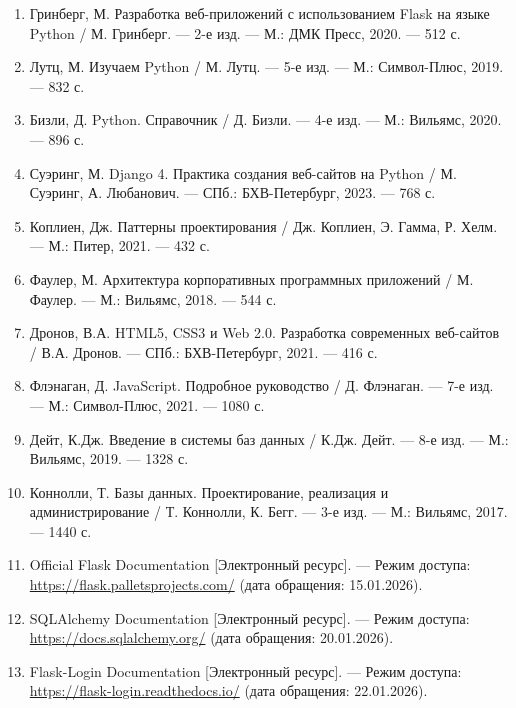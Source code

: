 \documentclass[14pt,a4paper,oneside]{extarticle}
\begin{document}
\begin{enumerate}[leftmargin=2cm]
    \item Гринберг, М. Разработка веб-приложений с использованием Flask на языке Python / М. Гринберг. --- 2-е изд. --- М.: ДМК Пресс, 2020. --- 512 с.

    \item Лутц, М. Изучаем Python / М. Лутц. --- 5-е изд. --- М.: Символ-Плюс, 2019. --- 832 с.

    \item Бизли, Д. Python. Справочник / Д. Бизли. --- 4-е изд. --- М.: Вильямс, 2020. --- 896 с.

    \item Суэринг, М. Django 4. Практика создания веб-сайтов на Python / М. Суэринг, А. Любанович. --- СПб.: БХВ-Петербург, 2023. --- 768 с.

    \item Коплиен, Дж. Паттерны проектирования / Дж. Коплиен, Э. Гамма, Р. Хелм. --- М.: Питер, 2021. --- 432 с.

    \item Фаулер, М. Архитектура корпоративных программных приложений / М. Фаулер. --- М.: Вильямс, 2018. --- 544 с.

    \item Дронов, В.А. HTML5, CSS3 и Web 2.0. Разработка современных веб-сайтов / В.А. Дронов. --- СПб.: БХВ-Петербург, 2021. --- 416 с.

    \item Флэнаган, Д. JavaScript. Подробное руководство / Д. Флэнаган. --- 7-е изд. --- М.: Символ-Плюс, 2021. --- 1080 с.

    \item Дейт, К.Дж. Введение в системы баз данных / К.Дж. Дейт. --- 8-е изд. --- М.: Вильямс, 2019. --- 1328 с.

    \item Коннолли, Т. Базы данных. Проектирование, реализация и администрирование / Т. Коннолли, К. Бегг. --- 3-е изд. --- М.: Вильямс, 2017. --- 1440 с.

    \item Official Flask Documentation [Электронный ресурс]. --- Режим доступа: \url{https://flask.palletsprojects.com/} (дата обращения: 15.01.2026).

    \item SQLAlchemy Documentation [Электронный ресурс]. --- Режим доступа: \url{https://docs.sqlalchemy.org/} (дата обращения: 20.01.2026).

    \item Flask-Login Documentation [Электронный ресурс]. --- Режим доступа: \url{https://flask-login.readthedocs.io/} (дата обращения: 22.01.2026).


\end{enumerate}
\end{document}

